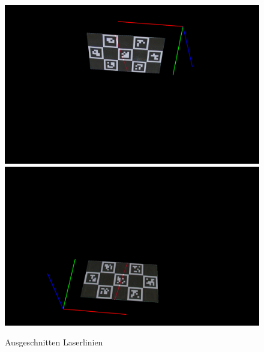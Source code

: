 		\begin{figure}[h]
			\centering
			\includegraphics[width=0.49\linewidth]{img/hauptteil/ext-calib/charuco_cut_primary.png}
			\includegraphics[width=0.49\linewidth]{img/hauptteil/ext-calib/charuco_cut_secondary.png}
			\caption{Ausgeschnitten Laserlinien}
			\label{fig:ext-calib-cut}
		\end{figure}
	
